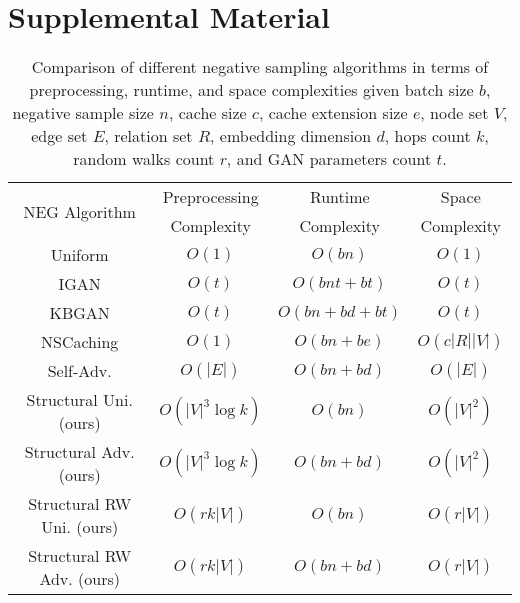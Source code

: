 \section{Supplemental Material}
\label{sec:supplemental}


\begin{table}[!htbp]
    \centering
    \begin{tabular}{cccc}
    \hline
         \multirow{2}{3cm}{\centering NEG Algorithm} & Preprocessing  & Runtime  & Space \\
         & Complexity & Complexity & Complexity
         \\
         \hline
         Uniform \cite{bordes2013translating} & $O(1)$ & $O(bn)$ & $O(1)$ \\
         IGAN \cite{yu2014improving} & $O(t)$ & $O(bnt + bt)$ & $O(t)$ \\
         KBGAN \cite{cai2017kbgan} & $O(t)$ & $O(bn + bd + bt)$ & $O(t)$ \\
         NSCaching \cite{zhang2019nscaching} & $O(1)$ & $O(bn + be)$ & $O(c|R||V|)$ \\
         Self-Adv. \cite{sun2019rotate} & $O(|E|)$ & $O(bn + bd)$ & $O(|E|)$ \\
         Structural Uni. (ours) & $O(|V|^3\log k)$ & $O(bn)$ & $O(|V|^2)$ \\
         Structural Adv. (ours) & $O(|V|^3\log k)$ & $O(bn + bd)$ & $O(|V|^2)$ \\
         Structural RW Uni. (ours) & $O(rk|V|)$ & $O(bn)$ & $O(r|V|)$ \\
         Structural RW Adv. (ours) & $O(rk|V|)$ & $O(bn + bd)$ & $O(r|V|)$ \\
         \hline
    \end{tabular}
    \caption{Comparison of different negative sampling algorithms in terms of preprocessing, runtime, and space complexities given batch size $b$, negative sample size $n$, cache size $c$, cache extension size $e$, node set $V$, edge set $E$, relation set $R$, embedding dimension $d$, hops count $k$, random walks count $r$, and GAN parameters count $t$.}
    \label{tab:times}
\end{table}


